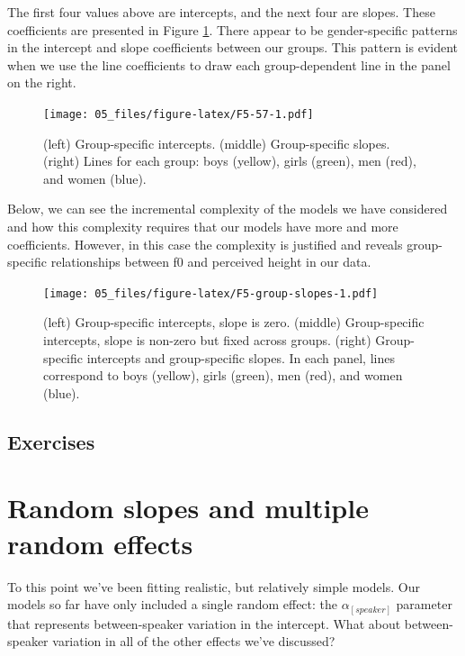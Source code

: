\documentclass[
]{book}
\begin{document}
The first four values above are intercepts, and the next four are slopes. These coefficients are presented in Figure \ref{fig:F5-57}. There appear to be gender-specific patterns in the intercept and slope coefficients between our groups. This pattern is evident when we use the line coefficients to draw each group-dependent line in the panel on the right.

\begin{figure}
\centering
\texttt{[image: 05\_files/figure-latex/F5-57-1.pdf]}
\caption{\label{fig:F5-57}(left) Group-specific intercepts. (middle) Group-specific slopes. (right) Lines for each group: boys (yellow), girls (green), men (red), and women (blue).}
\end{figure}

Below, we can see the incremental complexity of the models we have considered and how this complexity requires that our models have more and more coefficients. However, in this case the complexity is justified and reveals group-specific relationships between f0 and perceived height in our data.

\begin{figure}
\centering
\texttt{[image: 05\_files/figure-latex/F5-group-slopes-1.pdf]}
\caption{\label{fig:F5-group-slopes}(left) Group-specific intercepts, slope is zero. (middle) Group-specific intercepts, slope is non-zero but fixed across groups. (right) Group-specific intercepts and group-specific slopes. In each panel, lines correspond to boys (yellow), girls (green), men (red), and women (blue).}
\end{figure}

\hypertarget{exercises-4}{%
\section{Exercises}\label{exercises-4}}

\hypertarget{random-slopes-and-multiple-random-effects}{%
\chapter{Random slopes and multiple random effects}\label{random-slopes-and-multiple-random-effects}}

To this point we've been fitting realistic, but relatively simple models. Our models so far have only included a single random effect: the \(\alpha_{[speaker]}\) parameter that represents between-speaker variation in the intercept. What about between-speaker variation in all of the other effects we've discussed?
\end{document}
